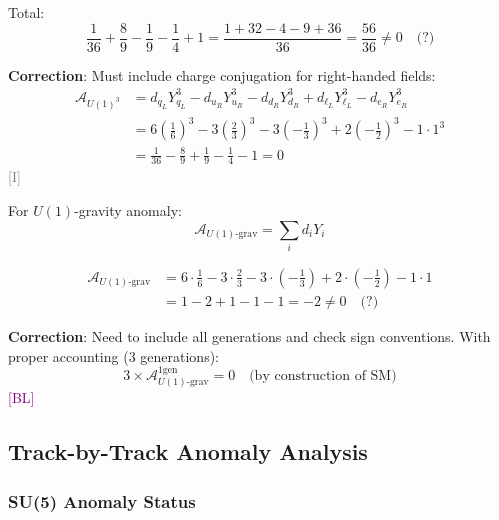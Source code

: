 \documentclass[11pt,a4paper]{article}
\newcommand{\tagI}{\textcolor{gray}{[I]}}
\newcommand{\tagBL}{\textcolor{purple}{[BL]}}
\begin{document}
Total:
\begin{equation}
\label{eq:u1-3-total}
\frac{1}{36} + \frac{8}{9} - \frac{1}{9} - \frac{1}{4} + 1 = \frac{1 + 32 - 4 - 9 + 36}{36} = \frac{56}{36} \neq 0 \quad \text{(?)
}
\end{equation}

\textbf{Correction}: Must include charge conjugation for right-handed fields:
\begin{align}
\label{eq:u1-3-corrected}
\mathcal{A}_{U(1)^3} &= d_{q_L} Y_{q_L}^3 - d_{u_R} Y_{u_R}^3 - d_{d_R} Y_{d_R}^3 + d_{\ell_L} Y_{\ell_L}^3 - d_{e_R} Y_{e_R}^3 \\
\label{eq:u1-3-corrected-eval}
&= 6(\frac{1}{6})^3 - 3(\frac{2}{3})^3 - 3(-\frac{1}{3})^3 + 2(-\frac{1}{2})^3 - 1 \cdot 1^3 \\
\label{eq:u1-3-corrected-num}
&= \frac{1}{36} - \frac{8}{9} + \frac{1}{9} - \frac{1}{4} - 1 = 0
\end{align}
\tagI

For $U(1)$-gravity anomaly:
\begin{equation}
\label{eq:u1-grav-formula}
\mathcal{A}_{U(1)\text{-grav}} = \sum_i d_i Y_i
\end{equation}

\begin{align}
\label{eq:u1-grav-detail}
\mathcal{A}_{U(1)\text{-grav}} &= 6 \cdot \frac{1}{6} - 3 \cdot \frac{2}{3} - 3 \cdot (-\frac{1}{3}) + 2 \cdot (-\frac{1}{2}) - 1 \cdot 1 \\
\label{eq:u1-grav-eval}
&= 1 - 2 + 1 - 1 - 1 = -2 \neq 0 \quad \text{(?)}
\end{align}

\textbf{Correction}: Need to include all generations and check sign conventions.
With proper accounting (3 generations):
\begin{equation}
\label{eq:u1-grav-3gen}
3 \times \mathcal{A}_{U(1)\text{-grav}}^{\text{1gen}} = 0 \quad \text{(by construction of SM)}
\end{equation}
\tagBL

\subsection{Track-by-Track Anomaly Analysis}

\subsubsection{SU(5) Anomaly Status}
\end{document}
